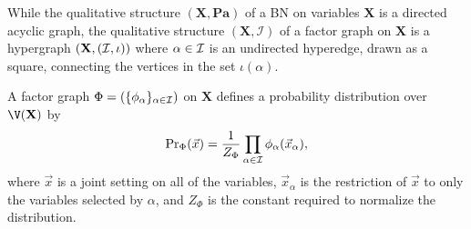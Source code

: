 {%
While the qualitative structure $(\mathbf X, \mathbf{Pa})$ of a BN on variables $\mathbf X$ is a directed acyclic graph, the qualitative structure $(\mathbf X, \mathcal I)$ of a factor graph on $\mathbf X$ is
a hypergraph $(\mathbf X, (\cal I, \iota))$ where
	$\alpha \in \cal I$ is an undirected hyperedge, drawn as a
	square, connecting the vertices in the set $\iota(\alpha)$.  




A factor graph $\Phi = (\{\phi_\alpha\}_{\alpha \in \cal I})$ on $\mathbf X$ defines a probability distribution over $\V(\mathbf X)$ by 
\begin{align*}
			\Pr\nolimits_\Phi(\vec x) 
	= \frac{1}{Z_\Phi} \prod_{\alpha \in \cal I}
							\phi_\alpha(\vec x_{\alpha}), 
\end{align*}
where $\vec{x}$ is a joint setting on all of the variables, $\vec{x}_\alpha$ is the restriction of $\vec{x}$ to only the variables selected by $\alpha$, and $Z_\Phi$ is the constant required to normalize the distribution. 
	
}
